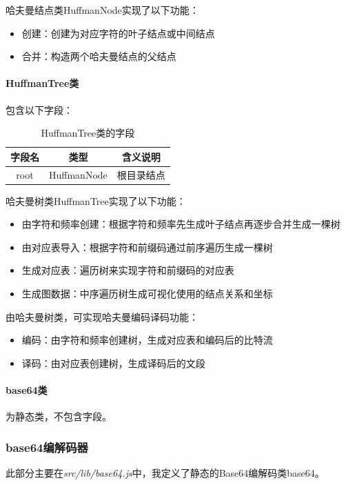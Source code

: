 \documentclass[scheme = chinese]{ctexart}
\begin{document}
哈夫曼结点类HuffmanNode实现了以下功能：
\begin{itemize}
    \item 创建：创建为对应字符的叶子结点或中间结点
    \item 合并：构造两个哈夫曼结点的父结点
\end{itemize}

\paragraph{HuffmanTree类} 包含以下字段：
\begin{table}[H]
    \centering
    \caption{HuffmanTree类的字段}
    \begin{tabular}{ccc}
        \toprule
        字段名 & 类型 & 含义说明 \\
        \midrule
        root & HuffmanNode & 根目录结点 \\
        \bottomrule
    \end{tabular}
\end{table}

哈夫曼树类HuffmanTree实现了以下功能：
\begin{itemize}
    \item 由字符和频率创建：根据字符和频率先生成叶子结点再逐步合并生成一棵树
    \item 由对应表导入：根据字符和前缀码通过前序遍历生成一棵树
    \item 生成对应表：遍历树来实现字符和前缀码的对应表
    \item 生成图数据：中序遍历树生成可视化使用的结点关系和坐标
\end{itemize}

由哈夫曼树类，可实现哈夫曼编码译码功能：
\begin{itemize}
    \item 编码：由字符和频率创建树，生成对应表和编码后的比特流
    \item 译码：由对应表创建树，生成译码后的文段
\end{itemize}

\paragraph{base64类} 为静态类，不包含字段。

\subsubsection{base64编解码器}
此部分主要在\emph{src/lib/base64.js}中，我定义了静态的Base64编解码类base64。
\end{document}

